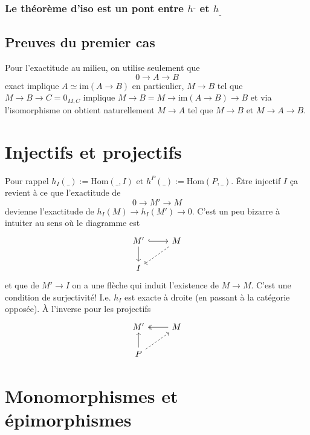 \documentclass[a4paper,12pt]{book}
\newcommand{\Hom}{\textrm{Hom}}
\newcommand{\im}{\textrm{im}}
\theoremstyle{plain}
\theoremstyle{definition}
\theoremstyle{remark}
\begin{document}
\subsubsection{Le théorème d'iso est un pont entre $h^{\_}$ et $h_{\_}$}


\subsection{Preuves du premier cas}
Pour l'exactitude au milieu, on utilise seulement que 
\[0\to A \to B\]
exact implique $A\simeq \im(A\to B)$ en particulier, $M\to B$
tel que $M\to B\to C = 0_{M,C}$ implique 
$M\to B=M\to \im(A\to B)\to B$ et via l'isomorphisme on obtient
naturellement $M\to A$ tel que $M\to B$ et $M\to A\to B$.

\section{Injectifs et projectifs}
Pour rappel $h_I(\_):=\Hom(\_,I)$ et 
$h^{P}(\_):=\Hom(P,\_)$. Être injectif $I$ ça
revient à ce que l'exactitude de 
\[0\to M'\to M\]
devienne l'exactitude de $h_I(M)\to h_I(M')\to 0$.
C'est un peu bizarre à intuiter au sens où le
diagramme est
\[\begin{tikzcd}
	{M'} & M \\
	I
	\arrow[hook, from=1-1, to=1-2]
	\arrow[from=1-1, to=2-1]
	\arrow[dashed, from=1-2, to=2-1]
\end{tikzcd}\]
et que de $M'\to I$ on a une flèche qui induit l'existence
de $M\to M$. C'est une condition de surjectivité! I.e.
$h_I$ est exacte à droite (en passant à la catégorie opposée). 
À l'inverse pour les projectifs
\[\begin{tikzcd}
	{M'} & M \\
	P
	\arrow[two heads, from=1-2, to=1-1]
	\arrow[from=2-1, to=1-1]
	\arrow[dashed, from=2-1, to=1-2]
\end{tikzcd}\]

\section{Monomorphismes et épimorphismes}
\end{document}

